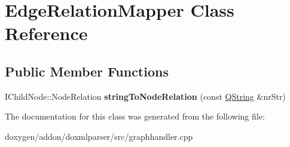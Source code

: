 \hypertarget{class_edge_relation_mapper}{}\section{Edge\+Relation\+Mapper Class Reference}
\label{class_edge_relation_mapper}
\subsection*{Public Member Functions}
\begin{DoxyCompactItemize}
\item 
\mbox{\label{class_edge_relation_mapper_a7edebfd88f9096274931a3e8f66ae6f6}} 
I\+Child\+Node\+::\+Node\+Relation {\bfseries string\+To\+Node\+Relation} (const \mbox{\hyperlink{class_q_string}{Q\+String}} \&nr\+Str)
\end{DoxyCompactItemize}


The documentation for this class was generated from the following file\+:\begin{DoxyCompactItemize}
\item 
doxygen/addon/doxmlparser/src/graphhandler.\+cpp\end{DoxyCompactItemize}
